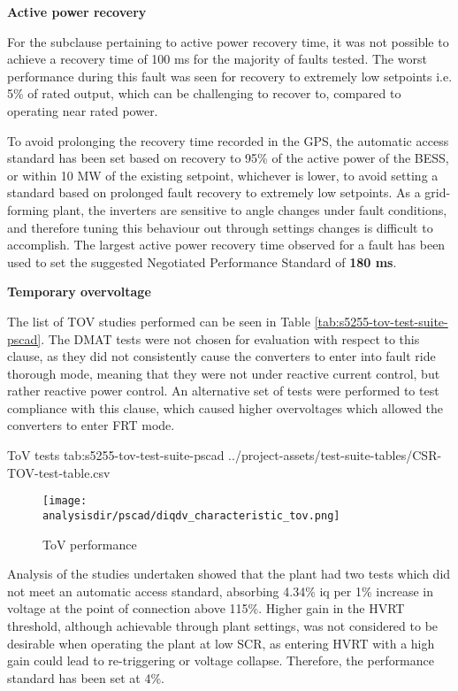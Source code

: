 \documentclass{../grid-link-report}
\newcommand{\projectassetsdir}{../project-assets}
\newcommand{\analysisdir}{report-assets/analysis}
\begin{document}
			\textbf{Active power recovery}
			
			For the subclause pertaining to active power recovery time, it was not possible to achieve a recovery time of 100 ms for the majority of faults tested. The worst performance during this fault was seen for recovery to extremely low setpoints i.e. 5\% of rated output, which can be challenging to recover to, compared to operating near rated power.
			
			To avoid prolonging the recovery time recorded in the GPS, the automatic access standard has been set based on recovery to 95\% of the active power of the BESS, or within 10 MW of the existing setpoint, whichever is lower, to avoid setting a standard based on prolonged fault recovery to extremely low setpoints. As a grid-forming plant, the inverters are sensitive to angle changes under fault conditions, and therefore tuning this behaviour out through settings changes is difficult to accomplish. The largest active power recovery time observed for a fault has been used to set the suggested Negotiated Performance Standard of \textbf{180 ms}.
		

			\textbf{Temporary overvoltage}
			
			The list of \ac{TOV} studies performed can be seen in Table \ref{tab:s5255-tov-test-suite-pscad}. The DMAT tests were not chosen for evaluation with respect to this clause, as they did not consistently cause the converters to enter into fault ride thorough mode, meaning that they were not under reactive current control, but rather reactive power control. An alternative set of tests were performed to test compliance with this clause, which caused higher overvoltages which allowed the converters to enter \ac{FRT} mode.
			
			{
				\autoscaledlongtable
				{ToV tests}
				{tab:s5255-tov-test-suite-pscad}
				{\projectassetsdir/test-suite-tables/CSR-TOV-test-table.csv}
			}
			
			\begin{figure}[H]
				\centering
				\texttt{[image: \\analysisdir/pscad/diqdv\_characteristic\_tov.png]}
				\caption{ToV performance}
				\label{fig:iq-tov}
			\end{figure}
			
			Analysis of the studies undertaken showed that the plant had two tests which did not meet an automatic access standard, absorbing 4.34\% iq per 1\% increase in voltage at the point of connection above 115\%. Higher gain in the HVRT threshold, although achievable through plant settings, was not considered to be desirable when operating the plant at low SCR, as entering HVRT with a high gain could lead to re-triggering or voltage collapse. Therefore, the performance standard has been set at 4\%. 
			
\end{document}
